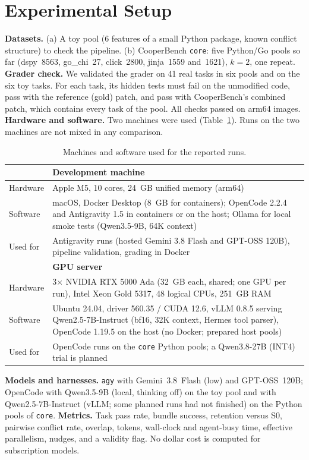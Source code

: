\documentclass[sigconf,nonacm]{acmart}
\begin{document}
\section{Experimental Setup}
\textbf{Datasets.} (a) A toy pool (6 features of a small Python package, known conflict structure) to check the pipeline. (b) CooperBench \texttt{core}: five Python/Go pools so far (dspy~8563, go\_chi~27, click~2800, jinja~1559 and~1621), $k{=}2$, one repeat. \textbf{Grader check.} We validated the grader on 41 real tasks in six pools and on the six toy tasks. For each task, its hidden tests must fail on the unmodified code, pass with the reference (gold) patch, and pass with CooperBench's combined patch, which contains every task of the pool. All checks passed on arm64 images.
\textbf{Hardware and software.} Two machines were used (Table~\ref{tab:hw}). Runs on the two machines are not mixed in any comparison.
\begin{table}[t]
\caption{Machines and software used for the reported runs.}
\label{tab:hw}
\footnotesize
\renewcommand{\arraystretch}{1.2}
\begin{tabular}{@{}p{}p{}@{}}
\toprule
 & \textbf{Development machine} \\
\midrule
Hardware & Apple M5, 10 cores, 24~GB unified memory (arm64) \\
Software & macOS, Docker Desktop (8~GB for containers); OpenCode 2.2.4 and Antigravity 1.5 in containers or on the host; Ollama for local smoke tests (Qwen3.5-9B, 64K context) \\
Used for & Antigravity runs (hosted Gemini 3.8 Flash and GPT-OSS 120B), pipeline validation, grading in Docker \\
\midrule
 & \textbf{GPU server} \\
\midrule
Hardware & 3$\times$ NVIDIA RTX 5000 Ada (32~GB each, shared; one GPU per run), Intel Xeon Gold 5317, 48 logical CPUs, 251~GB RAM \\
Software & Ubuntu 24.04, driver 560.35 / CUDA 12.6, vLLM 0.8.5 serving Qwen2.5-7B-Instruct (bf16, 32K context, Hermes tool parser), OpenCode 1.19.5 on the host (no Docker; prepared host pools) \\
Used for & OpenCode runs on the \texttt{core} Python pools; a Qwen3.8-27B (INT4) trial is planned \\
\bottomrule
\end{tabular}
\end{table}

\textbf{Models and harnesses.} \texttt{agy} with Gemini~3.8~Flash (low) and GPT-OSS~120B; OpenCode with Qwen3.5-9B (local, thinking off) on the toy pool and with Qwen2.5-7B-Instruct (vLLM; some planned runs had not finished) on the Python pools of \texttt{core}.
\textbf{Metrics.} Task pass rate, bundle success, retention versus S0, pairwise conflict rate, overlap, tokens, wall-clock and agent-busy time, effective parallelism, nudges, and a validity flag. No dollar cost is computed for subscription models.
\end{document}
